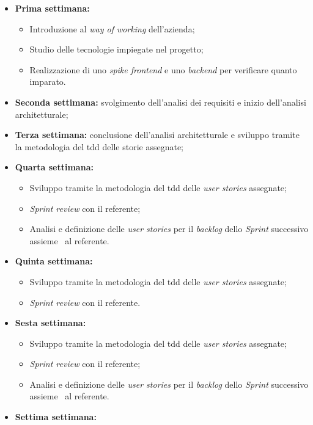 \begin{itemize}
  \item \textbf{Prima settimana:} 
    \begin{itemize}
      \item Introduzione al \emph{way of working} dell'azienda;
      \item Studio delle tecnologie impiegate nel progetto;
      \item Realizzazione di uno \emph{spike \gls{frontend}} e uno \emph{\gls{backend}} per verificare quanto imparato.
    \end{itemize}
  \item \textbf{Seconda settimana:} svolgimento dell'analisi dei requisiti e inizio dell'analisi architetturale;
  \item \textbf{Terza settimana:} conclusione dell'analisi architetturale e sviluppo tramite la metodologia del \acrshort{tdd} delle storie assegnate;
  \item \textbf{Quarta settimana:} 
    \begin{itemize}
      \item Sviluppo tramite la metodologia del \acrshort{tdd} delle \emph{user stories} assegnate;
      \item \emph{Sprint review} con il referente;
      \item Analisi e definizione delle \emph{user stories} per il \emph{backlog} dello \emph{Sprint} successivo assieme \
      al referente.
    \end{itemize}
  \item \textbf{Quinta settimana:} 
    \begin{itemize}
      \item Sviluppo tramite la metodologia del \acrshort{tdd} delle \emph{user stories} assegnate;
      \item \emph{Sprint review} con il referente.
    \end{itemize}
  \item \textbf{Sesta settimana:} 
    \begin{itemize}
      \item Sviluppo tramite la metodologia del \acrshort{tdd} delle \emph{user stories} assegnate;
      \item \emph{Sprint review} con il referente;
      \item Analisi e definizione delle \emph{user stories} per il \emph{backlog} dello \emph{Sprint} successivo assieme \
      al referente.
    \end{itemize}
  \item \textbf{Settima settimana:} 

\end{itemize}
